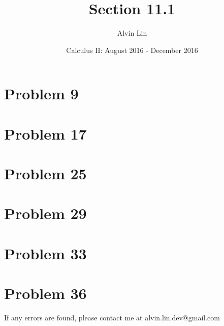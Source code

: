 \documentclass[letterpaper, 12pt]{article}
\title{Section 11.1}
\author{Alvin Lin}
\date{Calculus II: August 2016 - December 2016}
\begin{document}
\maketitle

\section*{Problem 9}
\section*{Problem 17}
\section*{Problem 25}
\section*{Problem 29}
\section*{Problem 33}
\section*{Problem 36}

\begin{center}
  If any errors are found, please contact me at alvin.lin.dev@gmail.com
\end{center}
\end{document}
